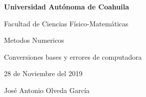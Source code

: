 \documentclass{article}
\begin{document}
\begin{center}
{\Large \textbf{Universidad Autónoma de Coahuila}}
\end{center}

\begin{center}
{\large Facultad de Ciencias Físico-Matemáticas}
\end{center}

\begin{center}
{\large Metodos Numericos}
\end{center}

\begin{center}
{\large Conversiones bases y errores de computadora}
\end{center}

\begin{center}
{\large 28 de Noviembre del 2019}
\end{center}

\begin{center}
{\large José Antonio Olveda García}
\end{center}

\vspace{5mm}
\end{document}
